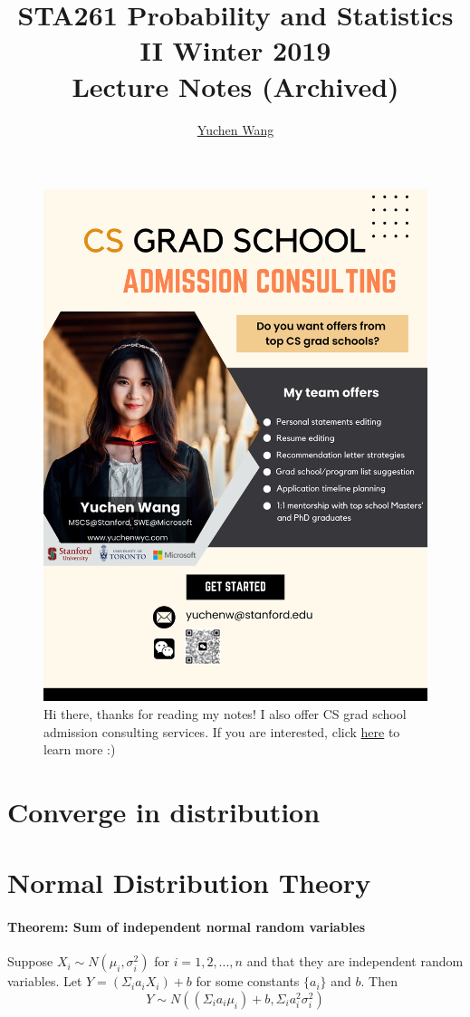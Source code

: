 \documentclass[11pt]{article}
\title{STA261 Probability and Statistics II Winter 2019\\ Lecture Notes (Archived)}
\author{\textcolor{blue}{\href{https://www.yuchenwyc.com}{Yuchen Wang}}}
\begin{document}
	\maketitle
	\tableofcontents
	\newpage
\begin{figure}[h]
	\centering
	\includegraphics[scale=0.21]{../ad.png}
	\caption{Hi there, thanks for reading my notes! I also offer CS grad school admission consulting services. If you are interested, click \textcolor{blue}{\href{https://www.yuchenwyc.com/files/admission_consulting.pdf}{here}} to learn more :)}
\end{figure}
\section{Converge in distribution}
\section{Normal Distribution Theory}
\paragraph{Theorem: Sum of independent normal random variables}
Suppose $X_i \sim N(\mu_i, \sigma^2_i)$ for $i = 1, 2,...,n$ and that they are independent random variables. Let $Y = (\Sigma_ia_iX_i) + b$ for some constants $\{a_i\}$ and $b$. Then
$$Y \sim N((\Sigma_ia_i\mu_i)+b, \Sigma_ia^2_i\sigma^2_i)$$
\end{document}
